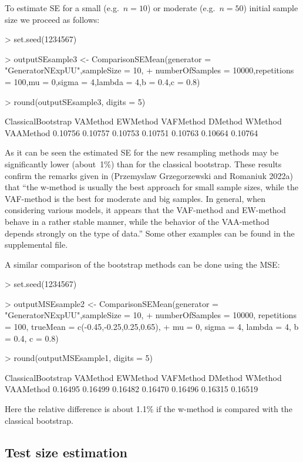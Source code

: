 To estimate SE for a small (e.g.~\(n=10\)) or moderate (e.g.~\(n=50\))
initial sample size we proceed as follows:

\begin{example}
\textgreater{} set.seed(1234567)

\textgreater{} outputSEsample3 \textless- ComparisonSEMean(generator =
"GeneratorNExpUU",sampleSize = 10, + numberOfSamples =
10000,repetitions = 100,mu = 0,sigma = 4,lambda = 4,b = 0.4,c = 0.8)

\textgreater{} round(outputSEsample3, digits = 5)

ClassicalBootstrap VAMethod EWMethod VAFMethod DMethod WMethod VAAMethod
0.10756 0.10757 0.10753 0.10751 0.10763 0.10664 0.10764
\end{example}

As it can be seen the estimated SE for the new resampling methods may be
significantly lower (about~1\%) than for the classical bootstrap. These
results confirm the remarks given in (Przemyslaw Grzegorzewski and Romaniuk 2022a) that ``the
w-method is usually the best approach for small sample sizes, while the
VAF-method is the best for moderate and big samples. In general, when
considering various models, it appears that the VAF-method and EW-method
behave in a rather stable manner, while the behavior of the VAA-method
depends strongly on the type of data.'' Some other examples can be found
in the supplemental file.

A similar comparison of the bootstrap methods can be done using the MSE:

\begin{example}
\textgreater{} set.seed(1234567)

\textgreater{} outputMSEsample2 \textless- ComparisonSEMean(generator =
"GeneratorNExpUU",sampleSize = 10, + numberOfSamples = 10000,
repetitions = 100, trueMean = c(-0.45,-0.25,0.25,0.65), + mu = 0, sigma
= 4, lambda = 4, b = 0.4, c = 0.8)

\textgreater{} round(outputMSEsample1, digits = 5)

ClassicalBootstrap VAMethod EWMethod VAFMethod DMethod WMethod VAAMethod
0.16495 0.16499 0.16482 0.16470 0.16496 0.16315 0.16519
\end{example}

Here the relative difference is about 1.1\% if the w-method is compared
with the classical bootstrap.

\hypertarget{test-size-estimation}{%
\subsection{Test size estimation}\label{test-size-estimation}}


